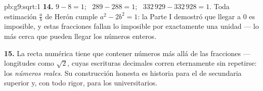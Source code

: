 \begin{solution}{pb:g9:sqrt:1}
\textbf{14.} $9 - 8 = 1$; \ $289 - 288 = 1$; \
$332\,929 - 332\,928 = 1$. Toda estimación $\frac ab$ de Herón
cumple $a^2 - 2b^2 = 1$: la Parte I demostró que llegar a $0$ es
imposible, y estas fracciones fallan lo imposible por exactamente
una unidad --- lo más cerca que pueden llegar los números enteros.

\textbf{15.} La recta numérica tiene que contener números más allá de las
fracciones --- longitudes como $\sqrt2$, cuyas escrituras decimales corren
eternamente sin repetirse: los \emph{números reales}. Su
construcción honesta es historia para el  de secundaria superior y,
con todo rigor, para los universitarios.
\end{solution}
